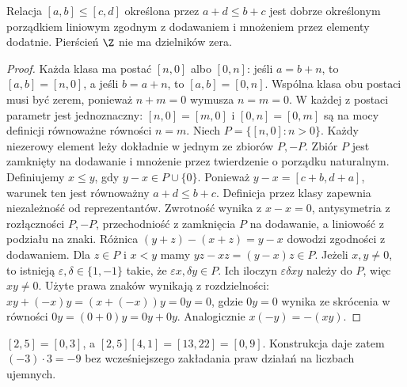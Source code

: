 \begin{twierdzenie}
\label{ma1:thm:integer-order}
Relacja $[a,b]\le[c,d]$ określona przez $a+d\le b+c$ jest dobrze określonym porządkiem liniowym zgodnym z dodawaniem i mnożeniem przez elementy dodatnie. Pierścień $\Z$ nie ma dzielników zera.
\end{twierdzenie}
\begin{proof}
Każda klasa ma postać $[n,0]$ albo $[0,n]$: jeśli $a=b+n$, to $[a,b]=[n,0]$, a jeśli $b=a+n$, to $[a,b]=[0,n]$. Wspólna klasa obu postaci musi być zerem, ponieważ $n+m=0$ wymusza $n=m=0$. W każdej z postaci parametr jest jednoznaczny: $[n,0]=[m,0]$ i $[0,n]=[0,m]$ są na mocy definicji równoważne równości $n=m$.
Niech $P=\{[n,0]:n>0\}$. Każdy niezerowy element leży dokładnie w jednym ze zbiorów $P,-P$. Zbiór $P$ jest zamknięty na dodawanie i mnożenie przez twierdzenie o porządku naturalnym. Definiujemy $x\le y$, gdy $y-x\in P\cup\{0\}$. Ponieważ $y-x=[c+b,d+a]$, warunek ten jest równoważny $a+d\le b+c$. Definicja przez klasy zapewnia niezależność od reprezentantów. Zwrotność wynika z $x-x=0$, antysymetria z rozłączności $P,-P$, przechodniość z zamknięcia $P$ na dodawanie, a liniowość z podziału na znaki. Różnica $(y+z)-(x+z)=y-x$ dowodzi zgodności z dodawaniem. Dla $z\in P$ i $x<y$ mamy $yz-xz=(y-x)z\in P$. Jeżeli $x,y\ne0$, to istnieją $\varepsilon,\delta\in\{1,-1\}$ takie, że $\varepsilon x,\delta y\in P$. Ich iloczyn $\varepsilon\delta xy$ należy do $P$, więc $xy\ne0$. Użyte prawa znaków wynikają z rozdzielności: $xy+(-x)y=(x+(-x))y=0y=0$, gdzie $0y=0$ wynika ze skrócenia w równości $0y=(0+0)y=0y+0y$. Analogicznie $x(-y)=-(xy)$.
\end{proof}
\begin{przyklad}
$[2,5]=[0,3]$, a $[2,5][4,1]=[13,22]=[0,9]$. Konstrukcja daje zatem $(-3)\cdot3=-9$ bez wcześniejszego zakładania praw działań na liczbach ujemnych.
\end{przyklad}

